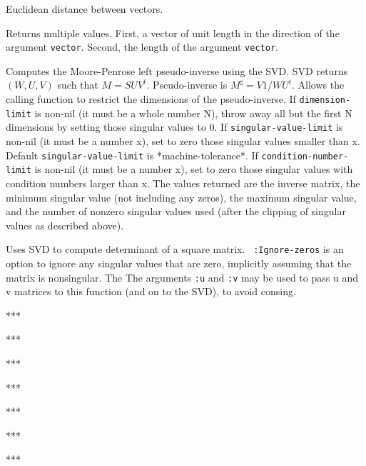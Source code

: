 \begin{description}
\item{}
Euclidean distance between vectors.

\item{}
Returns multiple values.  First, a vector of unit length in the
direction of the argument {\tt vector}.  
Second, the length of the argument {\tt vector}.

\item{}
Computes the Moore-Penrose left pseudo-inverse using the SVD.  
SVD returns $(W,U,V)$ such that $M = S U V^t$.  
Pseudo-inverse is $M^{\sharp} = V 1/W U^t$.  
Allows the calling function to restrict the dimensions of the
pseudo-inverse.
If {\tt dimension-limit} is non-nil (it must be a
whole number N), throw away all but the first N dimensions by setting
those singular values to 0.  If {\tt singular-value-limit} is non-nil (it
must be a number x), set to zero those singular values smaller than x.
Default {\tt singular-value-limit} is *machine-tolerance*.
If {\tt condition-number-limit} is non-nil (it must be a number x), 
set to zero those singular values with condition numbers larger than
x.
The values returned are the inverse matrix, 
the minimum singular value (not including any zeros),
the maximum singular value,
and the number of nonzero singular values used
(after the clipping of singular values as described above).

\item{}
Uses SVD to compute determinant of a square matrix.  {\tt
:Ignore-zeros} is an option to ignore any singular values that are zero,
implicitly assuming that the matrix is nonsingular.  The
The arguments {\tt :u} and {\tt :v} may be used to pass u and v matrices
to this function (and on to the SVD), to avoid consing.

\item{} ***
\item{} ***
\item{} ***
\item{} ***
\item{} ***
\item{} ***
\item{} ***


\end{description}
